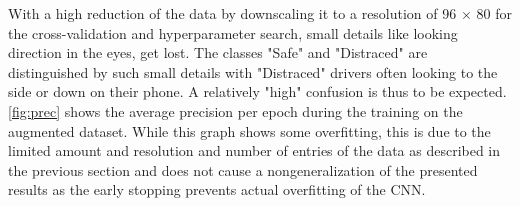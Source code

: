 \noindent
With a high reduction of the data by downscaling it to a resolution of 96 $\times$ 80 for the cross-validation and hyperparameter search, small details like looking direction in the eyes, get lost. The classes "Safe" and "Distraced" are distinguished by such small details with "Distraced" drivers often looking to the side or down on their phone. A relatively "high" confusion is thus to be expected. 
\autoref{fig:prec} shows the average precision per epoch during the training on the augmented dataset. While this graph shows some overfitting, this is due to the limited amount and resolution and number of entries of the data as described in the previous section and does not cause a nongeneralization of the presented results as the early stopping prevents actual overfitting of the CNN.
